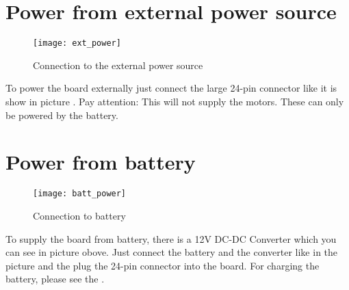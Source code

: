 \newpage

\section{Power from external power source}
\label{setup_external}

\begin{figure}[h]
	\centering
		\texttt{[image: ext\_power]}
	\caption{Connection to the external power source}
	\label{fig:ext_power}
\end{figure}
To power the board externally just connect the large 24-pin connector like it is show in picture . Pay attention: This will not supply the motors. These can only be powered by the battery.

\section{Power from battery}
\label{setup_battery}

\begin{figure}[h]
	\centering
		\texttt{[image: batt\_power]}
	\caption{Connection to battery}
	\label{fig:batt_power}
\end{figure}
To supply the board from battery, there is a 12V DC-DC Converter which you can see in picture  obove. Just connect the battery and the converter like in the picture and the plug the 24-pin connector into the board. For charging the battery, please see the .



